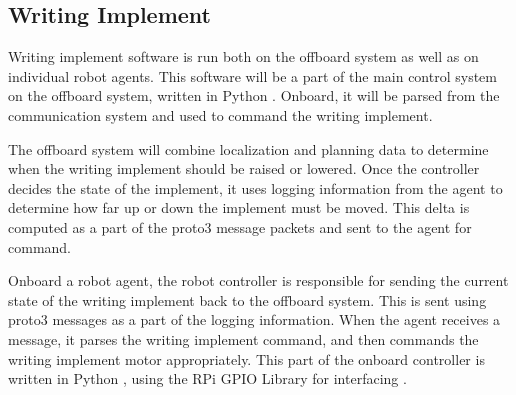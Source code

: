 
\subsection{Writing Implement}
\label{sec:software_writing_implement}
Writing implement software is run both on the offboard system as well as on individual robot agents. This software will be a part of the main control system on the offboard system, written in Python \cite{python27}. Onboard, it will be parsed from the communication system  and used to command the writing implement.

The offboard system will combine localization and planning data to determine when the writing implement should be raised or lowered. Once the controller decides the state of the implement, it uses logging information from the agent to determine how far up or down the implement must be moved. This delta is computed as a part of the proto3 message packets \cite{protobuf3} and sent to the agent for command.

Onboard a robot agent, the robot controller is responsible for sending the current state of the writing implement back to the offboard system. This is sent using proto3 messages \cite{protobuf3} as a part of the logging information. When the agent receives a message, it parses the writing implement command, and then commands the writing implement motor appropriately. This part of the onboard controller is written in Python \cite{python27}, using the RPi GPIO Library for interfacing \cite{python_rpigpio}.